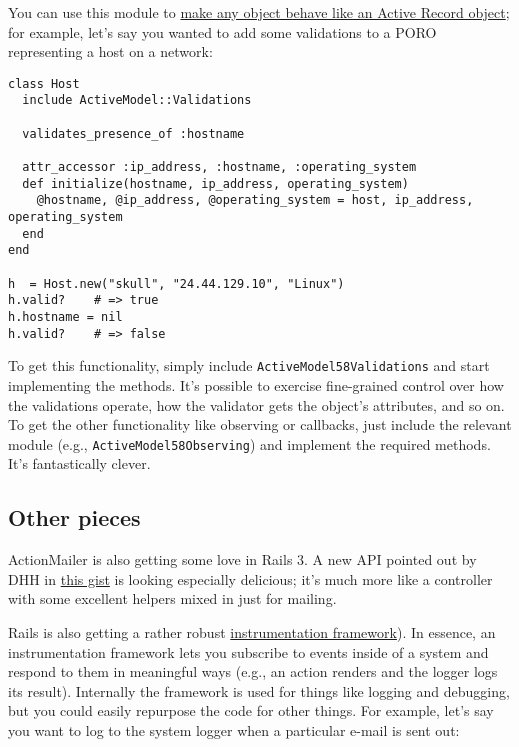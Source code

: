 \documentclass{book}
\begin{document}
You can use this module to \href{http://yehudakatz.com/2010/01/10/activemodel-make-any-ruby-object-feel-like-activerecord/}{make any object behave like an Active Record object}; for example, let'{}s say you wanted to add some validations to a PORO representing a host on a network:

\begin{verbatim}class Host
  include ActiveModel::Validations

  validates_presence_of :hostname

  attr_accessor :ip_address, :hostname, :operating_system
  def initialize(hostname, ip_address, operating_system)
    @hostname, @ip_address, @operating_system = host, ip_address, operating_system
  end
end

h  = Host.new("skull", "24.44.129.10", "Linux")
h.valid?    # => true
h.hostname = nil
h.valid?    # => false\end{verbatim}
To get this functionality, simply include {\colorbox[rgb]{0.87,0.87,0.87}{\tt ActiveModel\char58Validations}} and start implementing the methods. It'{}s possible to exercise fine-grained control over how the validations operate, how the validator gets the object'{}s attributes, and so on. To get the other functionality like observing or callbacks, just include the relevant module (e.g., {\colorbox[rgb]{0.87,0.87,0.87}{\tt ActiveModel\char58Observing}}) and implement the required methods. It'{}s fantastically clever.

\hypertarget{other_pieces}{}\subsection*{{Other pieces}}\label{other_pieces}

ActionMailer is also getting some love in Rails 3. A new API pointed out by DHH in \href{http://gist.github.com/281420}{this gist} is looking especially delicious; it'{}s much more like a controller with some excellent helpers mixed in just for mailing.

Rails is also getting a rather robust \href{http://en.wikipedia.org/wiki/Instrumentation_(computer_programming}{instrumentation framework}). In essence, an instrumentation framework lets you subscribe to events inside of a system and respond to them in meaningful ways (e.g., an action renders and the logger logs its result). Internally the framework is used for things like logging and debugging, but you could easily repurpose the code for other things. For example, let'{}s say you want to log to the system logger when a particular e-mail is sent out:
\end{document}
